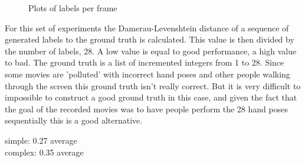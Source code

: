 \begin{figure}[htbp]
\center{}
\hspace{0.02\linewidth}
\hspace{0.02\linewidth}
\caption{Plots of labels per frame}
\label{fig:performances}
\end{figure}

For this set of experiments the Damerau-Levenshtein distance of a sequence of generated labels to the ground truth is calculated. This value is then divided by the number of labels, 28. A low value is equal to good performance, a high value to bad. The ground truth is a list of incremented integers from 1 to 28. Since some movies are 'polluted' with incorrect hand poses and other people walking through the screen this ground truth isn't really correct. But it is very difficult to impossible to construct a good ground truth in this case, and given the fact that the goal of the recorded movies was to have people perform the 28 hand poses sequentially this is a good alternative.

simple: 0.27 average\\
complex: 0.35 average\\

